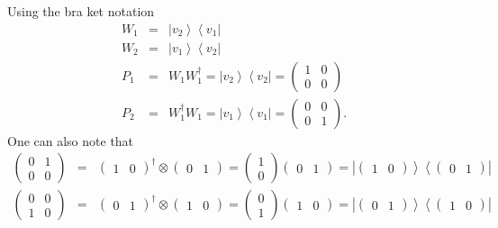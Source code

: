 \documentclass{article}
\begin{document}
Using the bra ket notation 
\begin{eqnarray}
W_{1} &=&\left\vert v_{2}\right\rangle \left\langle v_{1}\right\vert \\
W_{2} &=&\left\vert v_{1}\right\rangle \left\langle v_{2}\right\vert \\
P_{1} &=&W_{1}W_{1}^{\dagger }=\left\vert v_{2}\right\rangle \left\langle
v_{2}\right\vert =\left( 
\begin{array}{cc}
1 & 0 \\ 
0 & 0%
\end{array}%
\right) \\
P_{2} &=&W_{1}^{\dagger }W_{1}=\left\vert v_{1}\right\rangle \left\langle
v_{1}\right\vert =\left( 
\begin{array}{cc}
0 & 0 \\ 
0 & 1%
\end{array}%
\right) .
\end{eqnarray}%
One can also note that 
\begin{eqnarray}
\left( 
\begin{array}{cc}
0 & 1 \\ 
0 & 0%
\end{array}%
\right) &=&\left( 
\begin{array}{cc}
1 & 0%
\end{array}%
\right) ^{\dagger }\otimes \left( 
\begin{array}{cc}
0 & 1%
\end{array}%
\right) =\left( 
\begin{array}{c}
1 \\ 
0%
\end{array}%
\right) \left( 
\begin{array}{cc}
0 & 1%
\end{array}%
\right) =\left\vert \left( 
\begin{array}{cc}
1 & 0%
\end{array}%
\right) \right\rangle \left\langle \left( 
\begin{array}{cc}
0 & 1%
\end{array}%
\right) \right\vert \\
\left( 
\begin{array}{cc}
0 & 0 \\ 
1 & 0%
\end{array}%
\right) &=&\left( 
\begin{array}{cc}
0 & 1%
\end{array}%
\right) ^{\dagger }\otimes \left( 
\begin{array}{cc}
1 & 0%
\end{array}%
\right) =\left( 
\begin{array}{c}
0 \\ 
1%
\end{array}%
\right) \left( 
\begin{array}{cc}
1 & 0%
\end{array}%
\right) =\left\vert \left( 
\begin{array}{cc}
0 & 1%
\end{array}%
\right) \right\rangle \left\langle \left( 
\begin{array}{cc}
1 & 0%
\end{array}%
\right) \right\vert
\end{eqnarray}%
\end{document}
